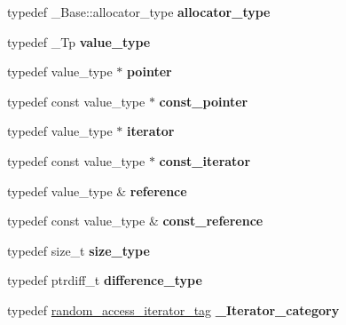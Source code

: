 \begin{DoxyCompactItemize}
\item 
\mbox{\label{structvector_a6860a35faf1558e7973089b866dae394}} 
typedef \+\_\+\+Base\+::allocator\+\_\+type {\bfseries allocator\+\_\+type}
\item 
\mbox{\label{structvector_a417488eed04ba6af23ec468e1d9d5609}} 
typedef \+\_\+\+Tp {\bfseries value\+\_\+type}
\item 
\mbox{\label{structvector_a5dc97c6e95109f0581268d280027e41b}} 
typedef value\+\_\+type $\ast$ {\bfseries pointer}
\item 
\mbox{\label{structvector_a23f8116002867a7eabfc9573ed8c600e}} 
typedef const value\+\_\+type $\ast$ {\bfseries const\+\_\+pointer}
\item 
\mbox{\label{structvector_abc2b132f6454a403ddd36c9c200b9e32}} 
typedef value\+\_\+type $\ast$ {\bfseries iterator}
\item 
\mbox{\label{structvector_a99c62d82e7555cf609670fef6d9f2e79}} 
typedef const value\+\_\+type $\ast$ {\bfseries const\+\_\+iterator}
\item 
\mbox{\label{structvector_ac108bda5785f91507eedfd55be84ed08}} 
typedef value\+\_\+type \& {\bfseries reference}
\item 
\mbox{\label{structvector_adb132ca32e178b5b8ec36e5053365c98}} 
typedef const value\+\_\+type \& {\bfseries const\+\_\+reference}
\item 
\mbox{\label{structvector_aa170ed4a6f97588a3c307163121f9abe}} 
typedef size\+\_\+t {\bfseries size\+\_\+type}
\item 
\mbox{\label{structvector_ab3abe0327ec599faa74375090b9a16a9}} 
typedef ptrdiff\+\_\+t {\bfseries difference\+\_\+type}
\item 
\mbox{\label{structvector_a2e773217fc82a90ea2f6d49b64aa5818}} 
typedef \hyperlink{structrandom__access__iterator__tag}{random\+\_\+access\+\_\+iterator\+\_\+tag} {\bfseries \+\_\+\+Iterator\+\_\+category}

\end{DoxyCompactItemize}
